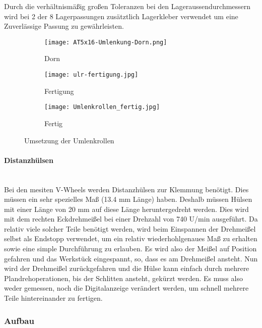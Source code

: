     Durch die verhältnismäßig großen Toleranzen bei den Lageraussendurchmessern wird bei 2 der 8 Lagerpassungen zusätztlich Lagerkleber verwendet um eine Zuverlässige Passung zu gewährleisten.

    \begin{figure}[H]
        \centering
        \begin{subfigure}{.3\textwidth}
            \centering
            \texttt{[image: AT5x16-Umlenkung-Dorn.png]}
            \caption{Dorn}
            \label{ulr:dorn}
        \end{subfigure}%
        \begin{subfigure}{.3\textwidth}
            \centering
            \texttt{[image: ulr-fertigung.jpg]}
            \caption{Fertigung}
            \label{ulr:f1}
        \end{subfigure}%
        \begin{subfigure}{.3\textwidth}
            \centering
            \texttt{[image: Umlenkrollen\_fertig.jpg]}
            \caption{Fertig}
            \label{ulr:f2}
        \end{subfigure}
        \caption{Umsetzung der Umlenkrollen}
        \label{ulr}
    \end{figure}

\paragraph{Distanzhülsen}\mbox{}\\
Bei den mesiten V-Wheels werden Distanzhülsen zur Klemmung benötigt. Dies müssen ein sehr spezielles Maß (13.4 mm Länge) haben. Deshalb müssen Hülsen mit einer Länge von 20 mm auf diese Länge heruntergedreht werden. Dies wird mit dem rechten Eckdrehmeißel bei einer Drehzahl von 740 U/min ausgeführt. Da relativ viele solcher Teile benötigt werden, wird beim Einspannen der Drehmeißel selbst als Endstopp verwendet, um ein relativ wiederhohlgenaues Maß zu erhalten sowie eine simple Durchführung zu erlauben. Es wird also der Meißel auf Position gefahren und das Werkstück eingespannt, so, dass es am Drehmeißel ansteht. Nun wird der Drehmeißel zurückgefahren und die Hülse kann einfach durch mehrere Plandrehoperationen, bis der Schlitten ansteht, gekürzt werden. Es muss also weder gemessen, noch die Digitalanzeige verändert werden, um schnell mehrere Teile hintereinander zu fertigen. 


\subsubsection{Aufbau}


